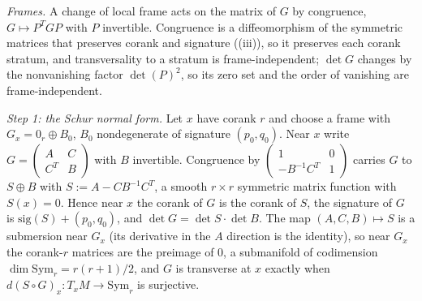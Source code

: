 \emph{Frames.} A change of local frame acts on the matrix of $G$ by congruence, $G \mapsto P^{T} G P$ with $P$ invertible. Congruence is a diffeomorphism of the symmetric matrices that preserves corank and signature ((iii)), so it preserves each corank stratum, and transversality to a stratum is frame-independent; $\det G$ changes by the nonvanishing factor $\det(P)^2$, so its zero set and the order of vanishing are frame-independent.

\emph{Step 1: the Schur normal form.} Let $x$ have corank $r$ and choose a frame with $G_x = 0_r \oplus B_0$, $B_0$ nondegenerate of signature $(p_0, q_0)$. Near $x$ write $G = \begin{pmatrix} A & C \\ C^{T} & B \end{pmatrix}$ with $B$ invertible. Congruence by $\begin{pmatrix} 1 & 0 \\ -B^{-1}C^{T} & 1 \end{pmatrix}$ carries $G$ to $S \oplus B$ with $S := A - C B^{-1} C^{T}$, a smooth $r \times r$ symmetric matrix function with $S(x) = 0$. Hence near $x$ the corank of $G$ is the corank of $S$, the signature of $G$ is $\mathrm{sig}(S) + (p_0, q_0)$, and $\det G = \det S \cdot \det B$. The map $(A, C, B) \mapsto S$ is a submersion near $G_x$ (its derivative in the $A$ direction is the identity), so near $G_x$ the corank-$r$ matrices are the preimage of $0$, a submanifold of codimension $\dim \mathrm{Sym}_r = r(r+1)/2$, and $G$ is transverse at $x$ exactly when $d(S \circ G)_x : T_xM \to \mathrm{Sym}_r$ is surjective.

